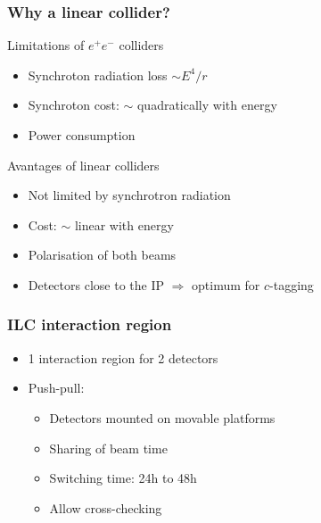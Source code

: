\documentclass{beamer}
\begin{document}
  \begin{frame}[plain]
    \frametitle{Why a linear collider?}

    \begin{block}{Limitations of $e^+e^-$ colliders}
      \begin{itemize}
        \item Synchroton radiation loss $\sim E^{4}/r$
        \item Synchroton cost: $\sim$ quadratically with energy
        \item Power consumption
      \end{itemize}
    \end{block}
    
    \begin{block}{Avantages of linear colliders}
      \begin{itemize}
        \item Not limited by synchrotron radiation
        \item Cost: $\sim$ linear with energy
        \item Polarisation of both beams
        \item Detectors close to the IP $\Rightarrow$ optimum for $c$-tagging
      \end{itemize}
    \end{block}
  \end{frame}

  \begin{frame}
    \frametitle{ILC interaction region}

    \begin{itemize}
      \item 1 interaction region for 2 detectors
      \item Push-pull:
      \begin{itemize}
        \item Detectors mounted on movable platforms
        \item Sharing of beam time
        \item Switching time: 24h to 48h
        \item Allow cross-checking
      \end{itemize}
    \end{itemize}
  \end{frame}
\end{document}
